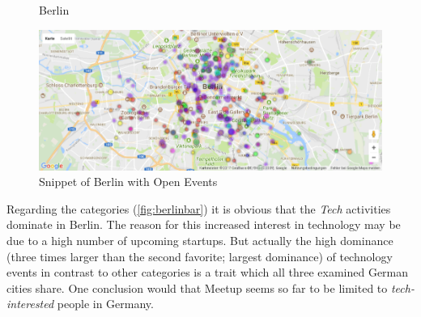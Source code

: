 \begin{figure}[!htp]
	\hfill
	\caption{Berlin}
\end{figure}


\begin{figure}[!htp]
	\includegraphics[width=1\linewidth]{images/Berlin_points.png}
	\caption{Snippet of Berlin with Open Events}\label{fig:berlinpoints}	
\end{figure}

Regarding the categories (\ref{fig:berlinbar}) it is obvious that the \emph{Tech} activities dominate in Berlin. The reason for this increased interest in technology may be due to a high number of upcoming startups. 
But actually the high dominance (three times larger than the second favorite; largest dominance) of technology events in contrast to other categories is a trait which all three examined German cities share. One conclusion would that Meetup seems so far to be limited to \emph{tech-interested} people in Germany. 

